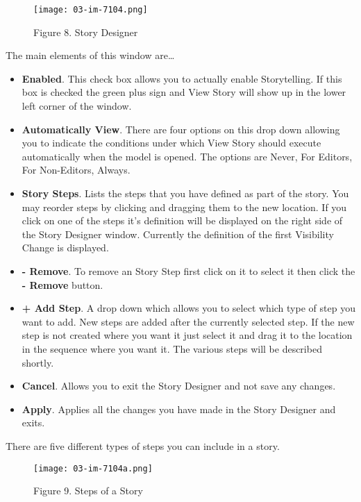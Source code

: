\documentclass[]{memoir}
\makeatletter
\def\maxwidth{\ifdim\Gin@nat@width>\linewidth\linewidth
\else\Gin@nat@width\fi}
\let\Oldincludegraphics\includegraphics
\renewcommand{\includegraphics}[1]{\Oldincludegraphics[width=\maxwidth]{#1}}
\makeatother
\begin{document}
\begin{figure}[htbp]
\centering
\texttt{[image: 03-im-7104.png]}
\caption{Figure 8. Story Designer}
\end{figure}

The main elements of this window are\ldots{}

\begin{itemize}
\itemsep1pt\parskip0pt
\item
  \textbf{Enabled}. This check box allows you to actually enable
  Storytelling. If this box is checked the green plus sign and View
  Story will show up in the lower left corner of the window.
\item
  \textbf{Automatically View}. There are four options on this drop down
  allowing you to indicate the conditions under which View Story should
  execute automatically when the model is opened. The options are Never,
  For Editors, For Non-Editors, Always.
\item
  \textbf{Story Steps}. Lists the steps that you have defined as part of
  the story. You may reorder steps by clicking and dragging them to the
  new location. If you click on one of the steps it's definition will be
  displayed on the right side of the Story Designer window. Currently
  the definition of the first Visibility Change is displayed.
\item
  \textbf{- Remove}. To remove an Story Step first click on it to select
  it then click the \textbf{- Remove} button.
\item
  \textbf{+ Add Step}. A drop down which allows you to select which type
  of step you want to add. New steps are added after the currently
  selected step. If the new step is not created where you want it just
  select it and drag it to the location in the sequence where you want
  it. The various steps will be described shortly.
\item
  \textbf{Cancel}. Allows you to exit the Story Designer and not save
  any changes.
\item
  \textbf{Apply}. Applies all the changes you have made in the Story
  Designer and exits.
\end{itemize}

There are five different types of steps you can include in a story.

\begin{figure}[htbp]
\centering
\texttt{[image: 03-im-7104a.png]}
\caption{Figure 9. Steps of a Story}
\end{figure}
\end{document}
